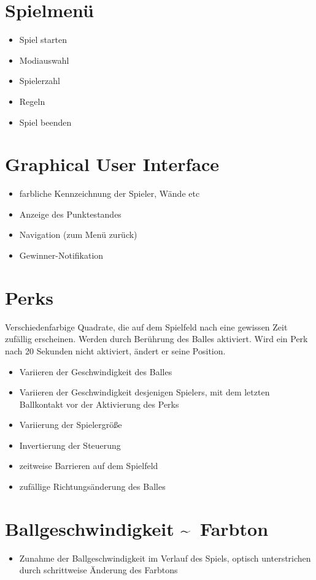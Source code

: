 \documentclass[a4paper, 10pt]{article}
\begin{document}
\section{Spielmenü}
\begin{itemize}
\item Spiel starten
\item Modiauswahl
\item Spielerzahl
\item Regeln
\item Spiel beenden
\end{itemize}
 
\section{Graphical User Interface}
\begin{itemize}
\item farbliche Kennzeichnung der Spieler, Wände etc
\item Anzeige des Punktestandes
\item Navigation (zum Menü zurück)
\item Gewinner-Notifikation
\end{itemize}

\section{Perks}
Verschiedenfarbige Quadrate, die auf dem Spielfeld nach eine gewissen Zeit zufällig erscheinen. Werden durch Berührung des Balles aktiviert. Wird ein Perk nach 20 Sekunden nicht aktiviert, ändert er seine Position. 
\begin{itemize}
\item Variieren der Geschwindigkeit des Balles
\item Variieren der Geschwindigkeit desjenigen Spielers, mit dem letzten Ballkontakt vor der Aktivierung des Perks
\item Variierung der Spielergröße
\item Invertierung der Steuerung
\item zeitweise Barrieren auf dem Spielfeld
\item zufällige Richtungsänderung des Balles
\end{itemize}


\section{Ballgeschwindigkeit \textasciitilde ~Farbton}
\begin{itemize}
\item Zunahme der Ballgeschwindigkeit im Verlauf des Spiels, optisch unterstrichen durch schrittweise Änderung des Farbtons
\end{itemize}
\end{document}
